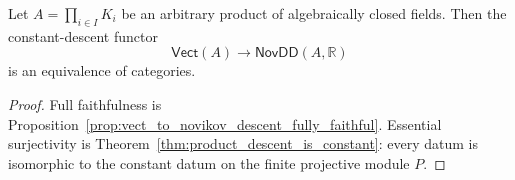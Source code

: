 \begin{theorem}
  \label{thm:novikov_descent_equivalence_prod_algclosed}
  \leanok
  Let $A=\prod_{i\in I}K_i$ be an arbitrary product of algebraically closed
  fields.  Then the constant-descent functor
  \[
    \mathsf{Vect}(A)\longrightarrow\mathsf{NovDD}(A,\mathbb{R})
  \]
  is an equivalence of categories.
\end{theorem}

\begin{proof}
  \leanok
  Full faithfulness is
  Proposition~\ref{prop:vect_to_novikov_descent_fully_faithful}.  Essential
  surjectivity is Theorem~\ref{thm:product_descent_is_constant}: every datum is
  isomorphic to the constant datum on the finite projective module $P$.
\end{proof}
